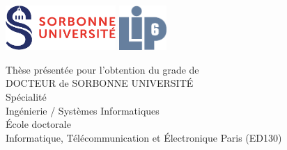 %

\newcommand{\jurymember}[5]{\hspace{1.5em}\textbf{{#1} \textsc{{#2}}}, {#3}, {#4} \hfill \textit{{#5}}\\}

\begin{titlepage}
	\begin{flushleft}
      \includegraphics[height=1.7cm]{figures/sorbonne.pdf}
      \hfill
      \includegraphics[height=1.7cm]{figures/LogoLIP6.pdf}
      \hfill
	\end{flushleft}
	\vfill
	\begin{center}
        \vspace{1em}
        {\large Thèse présentée pour l'obtention du grade de}\\
        \vspace{1em}
        {\LARGE DOCTEUR de SORBONNE UNIVERSITÉ}\\
        \vspace{2em}
		{\small Spécialité}\\
		\vspace{0.5em}
		{\Large Ingénierie / Systèmes Informatiques}\\
		\vspace{2em}
        {\large École doctorale}\\
		\vspace{0.5em}
		{\Large Informatique, Télécommunication et Électronique Paris (ED130)}\\
    \end{center}
	\vfill
	\begin{flushright}

\end{flushright}
\end{titlepage}

